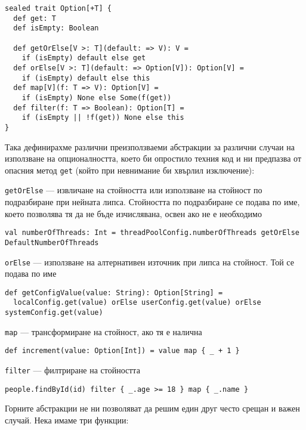\begin{lstlisting}
sealed trait Option[+T] {
  def get: T
  def isEmpty: Boolean
  
  def getOrElse[V >: T](default: => V): V =
    if (isEmpty) default else get
  def orElse[V >: T](default: => Option[V]): Option[V] =
    if (isEmpty) default else this
  def map[V](f: T => V): Option[V] =
    if (isEmpty) None else Some(f(get))
  def filter(f: T => Boolean): Option[T] =
    if (isEmpty || !f(get)) None else this
}
\end{lstlisting}

Така дефинирахме различни преизползваеми абстракции за различни случаи на използване на опционалността, което би опростило техния код и ни предпазва от опасния метод \lstinline|get| (който при невнимание би хвърлил изключение):

\begin{itemize*}
  \item \lstinline{getOrElse} — извличане на стойността или използване на стойност по подразбиране при нейната липса. Стойността по подразбиране се подава по име, което позволява тя да не бъде изчислявана, освен ако не е необходимо
  \begin{lstlisting}
val numberOfThreads: Int = threadPoolConfig.numberOfThreads getOrElse DefaultNumberOfThreads
  \end{lstlisting}
  
  \item \lstinline{orElse} — използване на алтернативен източник при липса на стойност. Той се подава по име
  \begin{lstlisting}
def getConfigValue(value: String): Option[String] =
  localConfig.get(value) orElse userConfig.get(value) orElse systemConfig.get(value)
  \end{lstlisting}
  
  \item \lstinline{map} — трансформиране на стойност, ако тя е налична
  \begin{lstlisting}
def increment(value: Option[Int]) = value map { _ + 1 }
  \end{lstlisting}
  
  \item \lstinline|filter| — филтриране на стойността
  \begin{lstlisting}
people.findById(id) filter { _.age >= 18 } map { _.name }
  \end{lstlisting}
\end{itemize*}

Горните абстракции не ни позволяват да решим един друг често срещан и важен случай. Нека имаме три функции:

